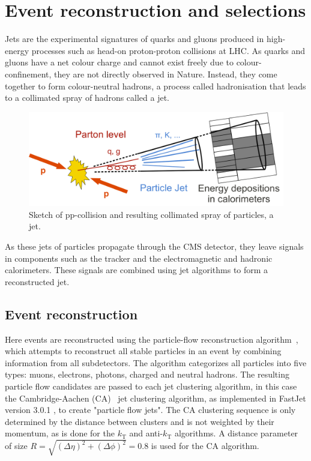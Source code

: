 \chapter{Event reconstruction and selections}
\label{label:EventsReconstruction}

Jets are the experimental signatures of quarks and gluons produced in high-energy processes such as head-on proton-proton collisions at LHC. As quarks and gluons have a net colour charge and cannot exist freely due to colour-confinement, they are not directly observed in Nature. 
Instead, they come together to form colour-neutral hadrons, a process called hadronisation that leads to a collimated spray of hadrons called a jet.
\begin{figure}
\centering
\includegraphics[width=.7\textwidth]{EventSelectionFigures/Sketch_PartonParticleCaloJet.png}
\caption{Sketch of pp-collision and resulting collimated spray of particles, a jet.}
\label{figs:jets}
\end{figure}  

As these jets of particles propagate through the CMS detector, they leave signals in components such as the tracker and the electromagnetic and hadronic calorimeters. These signals are combined using jet algorithms to form a reconstructed jet.  

\section{Event reconstruction}

Here events are reconstructed using the particle-flow reconstruction
algorithm~\cite{particleflow}, which attempts to reconstruct all
stable particles in an event by combining information from all
subdetectors. The algorithm categorizes all particles into five types:
muons, electrons, photons, charged and neutral hadrons. The resulting
particle flow candidates are passed to each jet clustering algorithm, in this case the
Cambridge-Aachen (CA)~\cite{CAaachen,CAcambridge}
jet clustering algorithm, as implemented in FastJet version 3.0.1 \cite{fastjet1,fastjet},
to create "particle flow jets".
The CA clustering sequence is only determined by the distance between
clusters and is not weighted by their momentum, as is done for the
$k_\text{T}$ and anti-$k_\text{T}$ algorithms. A distance parameter of
size $R=\sqrt{(\Delta \eta)^2 + (\Delta\phi)^2}=0.8$ is used for the CA algorithm.


